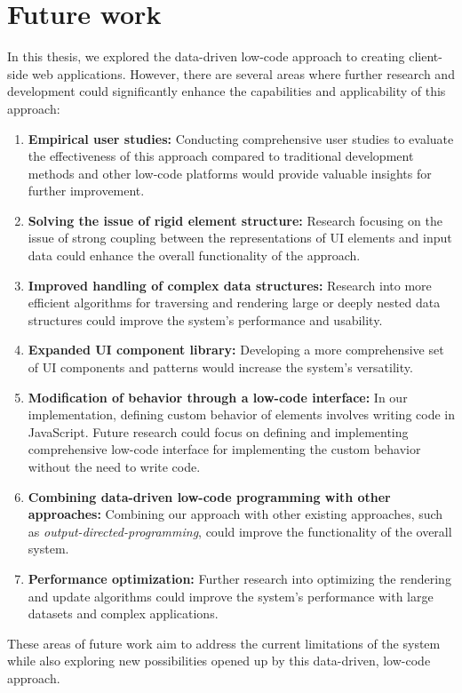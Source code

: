 \section{Future work}
In this thesis, we explored the data-driven low-code approach to creating client-side web applications.
However, there are several areas where further research and development could significantly enhance the capabilities and applicability of this approach:
\begin{enumerate}
	\item \textbf{Empirical user studies:} Conducting comprehensive user studies to evaluate the effectiveness of this approach compared to traditional development methods and other low-code platforms would provide valuable insights for further improvement.
	\item \textbf{Solving the issue of rigid element structure:} Research focusing on the issue of strong coupling between the representations of UI elements and input data could enhance the overall functionality of the approach.
	\item \textbf{Improved handling of complex data structures:} Research into more efficient algorithms for traversing and rendering large or deeply nested data structures could improve the system's performance and usability.
	\item \textbf{Expanded UI component library:} Developing a more comprehensive set of UI components and patterns would increase the system's versatility.
	\item \textbf{Modification of behavior through a low-code interface:} In our implementation, defining custom behavior of elements involves writing code in JavaScript.
	      Future research could focus on defining and implementing comprehensive low-code interface for implementing the custom behavior without the need to write code.
	\item \textbf{Combining data-driven low-code programming with other approaches:} Combining our approach with other existing approaches, such as \emph{output-directed-programming}\cite{output-directed-programming}, could improve the functionality of the overall system.
	\item \textbf{Performance optimization:} Further research into optimizing the rendering and update algorithms could improve the system's performance with large datasets and complex applications.
\end{enumerate}
These areas of future work aim to address the current limitations of the system while also exploring new possibilities opened up by this data-driven, low-code approach.
